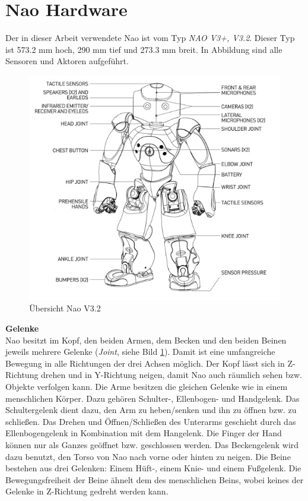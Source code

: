 \section{Nao Hardware}
\label{nao:hardware}
Der in dieser Arbeit verwendete Nao ist vom Typ \textit{NAO V3+, V3.2}. Dieser Typ ist 573.2 mm hoch, 290 mm tief und 273.3 mm breit. In Abbildung  sind alle Sensoren und Aktoren aufgeführt.
\\
\begin{figure}[H]						
	\centering							
	\includegraphics[scale=0.9]{Bilder/nao_overview.jpg}			
	\caption{Übersicht Nao V3.2}						
	\label{f:nao_ov}						
\end{figure}
\noindent
\textbf{Gelenke}
\\
Nao besitzt  im Kopf, den beiden Armen, dem Becken und den beiden Beinen jeweils mehrere Gelenke (\textit{Joint}, siehe Bild \ref{f:nao_ov}). Damit ist eine umfangreiche Bewegung in alle Richtungen der drei Achsen möglich. Der Kopf lässt sich in Z-Richtung drehen und in Y-Richtung neigen, damit Nao auch räumlich sehen bzw. Objekte verfolgen kann.
Die Arme besitzen die gleichen Gelenke wie in einem menschlichen Körper. Dazu gehören Schulter-, Ellenbogen- und Handgelenk. Das Schultergelenk dient dazu, den Arm zu heben/senken und ihn zu öffnen bzw. zu schließen. Das Drehen und Öffnen/Schließen des Unterarms geschieht durch das Ellenbogengelenk in Kombination mit dem Hangelenk. Die Finger der Hand können nur als Ganzes geöffnet bzw. geschlossen werden.
Das Beckengelenk wird dazu benutzt, den Torso von Nao nach vorne oder hinten zu neigen.
Die Beine bestehen aus drei Gelenken: Einem Hüft-, einem Knie- und einem Fußgelenk. Die Bewegungsfreiheit der Beine ähnelt dem des menschlichen Beins, wobei keines der Gelenke in Z-Richtung gedreht werden kann.


